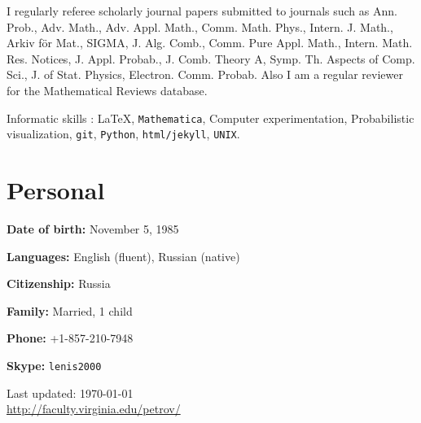 \documentclass[letterpaper,11pt]{article}
\def\footerlink{http://faculty.virginia.edu/petrov/}
\begin{document}
\smallskip


I regularly referee scholarly journal papers
submitted to journals such as 
Ann. Prob., 
Adv. Math., 
Adv. Appl. Math., 
Comm. Math. Phys.,
Intern. J. Math.,
Arkiv f\"or Mat.,
SIGMA,
J. Alg. Comb.,
Comm. Pure Appl. Math.,
Intern. Math. Res. Notices,
J. Appl. Probab.,
J. Comb. Theory A,
Symp. Th. Aspects of Comp. Sci.,
J. of Stat. Physics,
Electron. Comm. Probab.
Also I am a regular reviewer for the
Mathematical Reviews database.






\smallskip

Informatic skills : 
\LaTeX, 
\texttt{Mathematica}, 
Computer experimentation,
Probabilistic visualization,
\texttt{git},
\texttt{Python}, 
\texttt{html/jekyll}, \texttt{UNIX}.

\section*{Personal}

\textbf{Date of birth:} November 5, 1985

\textbf{Languages:} English (fluent), Russian (native)

\textbf{Citizenship:} Russia

\textbf{Family:} Married, 1 child

\textbf{Phone:} +1-857-210-7948

\textbf{Skype:} \texttt{lenis2000}


\bigskip

\begin{center}
  \begin{footnotesize}
    Last updated: \today \\
    \href{\footerlink}{\url{\footerlink}}
  \end{footnotesize}
\end{center}
 
\end{document}
